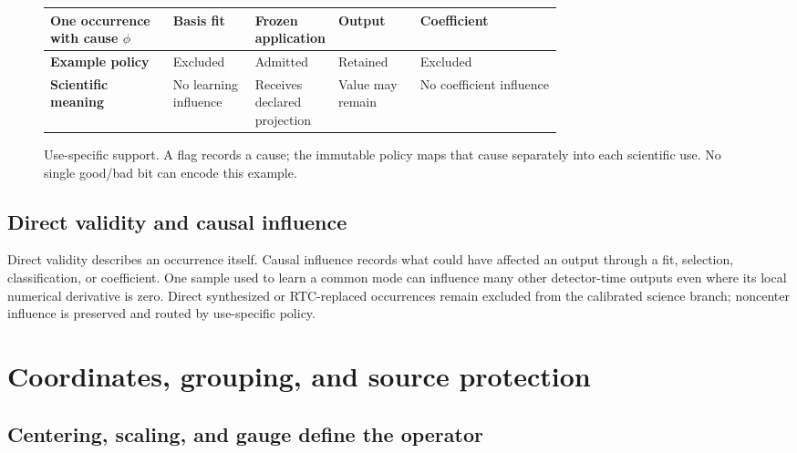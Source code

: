 \documentclass[11pt]{article}
\begin{document}
\begin{figure}[htbp]
\centering
\small
\begin{tabularx}{0.94\linewidth}{>{\raggedright\arraybackslash\bfseries}p{0.24\linewidth}
                                 >{\centering\arraybackslash}p{0.16\linewidth}
                                 >{\centering\arraybackslash}p{0.16\linewidth}
                                 >{\centering\arraybackslash}p{0.16\linewidth}
                                 >{\centering\arraybackslash}X}
\toprule
One occurrence with cause $\phi$ & Basis fit & Frozen application & Output & Coefficient \\
\midrule
Example policy & Excluded & Admitted & Retained & Excluded \\
Scientific meaning & No learning influence & Receives declared projection & Value may remain & No coefficient influence \\
\bottomrule
\end{tabularx}
\caption{Use-specific support. A flag records a cause; the immutable policy
maps that cause separately into each scientific use. No single good/bad bit
can encode this example.}
\label{fig:ptc-support}
\end{figure}

\subsection{Direct validity and causal influence}

Direct validity describes an occurrence itself. Causal influence records what
could have affected an output through a fit, selection, classification, or
coefficient. One sample used to learn a common mode can influence many other
detector-time outputs even where its local numerical derivative is zero.
Direct synthesized or RTC-replaced occurrences remain excluded from the
calibrated science branch; noncenter influence is preserved and routed by
use-specific policy.

\section{Coordinates, grouping, and source protection}
\label{sec:science-coordinates}

\subsection{Centering, scaling, and gauge define the operator}
\end{document}
